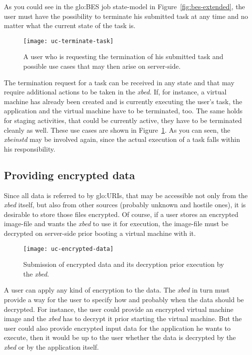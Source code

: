 As   you   could   see   in   the   \gls{glo:BES}   job   state-model   in
Figure~\ref{fig:bes-extended},  the  user  must  have the  possibility  to
terminate his  submitted task at any  time and no matter  what the current
state of the task is.

\begin{figure}[h!]
  \centering
  \texttt{[image: uc-terminate-task]}
  \caption[UC Terminate Task]{A user  who is requesting the termination of
    his  submitted task  and possible  use cases  that may  then  arise on
    server-side.}
  \label{fig:uc-terminate-task}
\end{figure}

The termination request  for a task can be received in  any state and that
may require  additional actions to be  taken in the  \emph{xbed}.  If, for
instance,  a virtual  machine has  already been  created and  is currently
executing the user's task, the application and the virtual machine have to
be terminated, too.  The same  holds for staging activities, that could be
currently active, they  have to be terminated cleanly  as well.  These use
cases are  shown in  Figure~\ref{fig:uc-terminate-task}. As you  can seen,
the \emph{xbeinstd} may be involved again, since the actual execution of a
task falls within his responsibility.

\subsection{Providing encrypted data}
\label{sec:uc-ecrypted-data}

Since all  data is referred to  by \gls{glo:URI}s, that  may be accessible
not  only  from  the  \emph{xbed}  itself, but  also  from  other  sources
(\ie probably unknown and  hostile ones), it is desirable  to store those
files encrypted. Of  course, if a user stores  an encrypted image-file and
wants  the \emph{xbed} to  use it  for execution,  the image-file  must be
decrypted on server-side prior booting a virtual machine with it.

\begin{figure}[h]
  \centering
  \texttt{[image: uc-encrypted-data]}
  \caption[UC  Encrypted  Data]{Submission   of  encrypted  data  and  its
    decryption prior execution by the \emph{xbed}.}
  \label{fig:uc-encrypt-data}
\end{figure}

A user  can apply any kind of  encryption to the data.  The \emph{xbed} in
turn must provide a way for the  user to specify how and probably when the
data  should  be decrypted.   For  instance,  the  user could  provide  an
encrypted  virtual machine  image and  the \emph{xbed}  has to  decrypt it
prior  starting the  virtual machine.   But  the user  could also  provide
encrypted  input data for  the application  he wants  to execute,  then it
would be up  to the user whether the data is  decrypted by the \emph{xbed}
or by the application itself.

